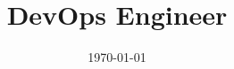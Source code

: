 \documentclass[11pt,a4]{moderncv}
\date{\today}
\title{DevOps Engineer}
\begin{document}
\makecvtitle






\end{document}
